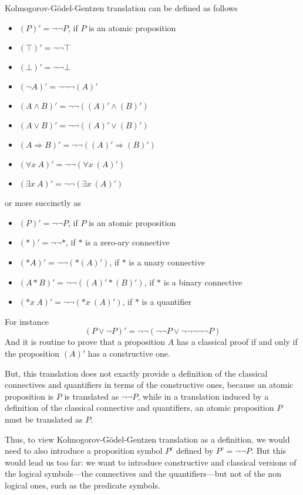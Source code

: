 \documentclass{article}
\newcommand{\fa}{\forall}
\newcommand{\ex}{\exists}
\begin{document}
Kolmogorov-G\"odel-Gentzen translation can be defined as follows
\begin{itemize}
\item $(P)' = \neg \neg P$, if $P$ is an atomic proposition
\item $(\top)' = \neg \neg \top$ 
\item $(\bot)' = \neg \neg \bot$ 
\item $(\neg A)' = \neg \neg \neg (A)'$
\item $(A \wedge B)' = \neg \neg ((A)' \wedge (B)')$
\item $(A \vee B)' = \neg \neg ((A)' \vee (B)')$
\item $(A \Rightarrow B)' = \neg \neg ((A)' \Rightarrow (B)')$
\item $(\fa x~A)' = \neg \neg (\fa x~(A)')$
\item $(\ex x~A)' = \neg \neg (\ex x~(A)')$
\end{itemize}
or more succinctly as 
\begin{itemize}
\item $(P)' = \neg \neg P$, if $P$ is an atomic proposition
\item $(*)' = \neg \neg *$, if $*$ is a zero-ary connective
\item $(* A)' = \neg \neg (* (A)')$, if $*$ is a unary connective
\item $(A * B)' = \neg \neg ((A)' * (B)')$, if $*$ is a binary connective
\item $(*x~A)' = \neg \neg (*x~(A)')$, if $*$ is a quantifier
\end{itemize}
For instance 
$$(P \vee \neg P)' = 
\neg \neg (\neg \neg P \vee \neg \neg \neg \neg \neg P)$$
And it is routine to prove that 
a proposition $A$ has a classical proof if and only if the
proposition $(A)'$ has a constructive one.  

But, this translation does not exactly provide a definition of the
classical connectives and quantifiers in terms of the constructive
ones, because an atomic proposition is $P$ is translated as $\neg \neg
P$, while in a translation induced by a definition of the classical
connective and quantifiers, an atomic proposition $P$ must be
translated as $P$.

Thus, to view Kolmogorov-G\"odel-Gentzen translation as a definition,
we would need to also introduce a proposition symbol $P^c$ defined by
$P^c = \neg \neg P$. But this would lead us too far: we want to
introduce constructive and classical versions of the logical
symbols---the connectives and the quantifiers---but not of the non
logical ones, such as the predicate symbols.
\end{document}

